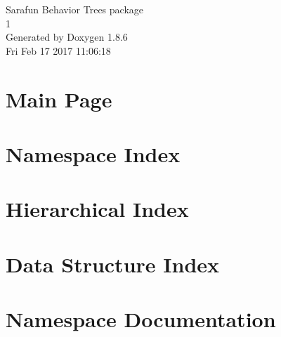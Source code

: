 \documentclass[twoside]{book}
\newcommand{\clearemptydoublepage}{%
  \newpage{\pagestyle{empty}\cleardoublepage}%
}
\begin{document}
\hypersetup{pageanchor=false}
\begin{titlepage}
\vspace*{7cm}
\begin{center}%
{\Large Sarafun Behavior Trees package \\[1ex]\large 1 }\\
\vspace*{1cm}
{\large Generated by Doxygen 1.8.6}\\
\vspace*{0.5cm}
{\small Fri Feb 17 2017 11:06:18}\\
\end{center}
\end{titlepage}
\clearemptydoublepage
\tableofcontents
\clearemptydoublepage
{}
\hypersetup{pageanchor=true}

\chapter{Main Page}
\label{index}\hypertarget{index}{}
\chapter{Namespace Index}

\chapter{Hierarchical Index}

\chapter{Data Structure Index}

\chapter{Namespace Documentation}



\end{document}
